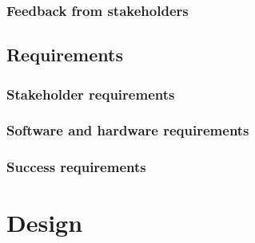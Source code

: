 \documentclass[11pt,a4paper]{article}
\begin{document}
\begin{comment}
limitations:

- time

- limited by any software

- money - hosting backend?
- not getting an apple dev account
so won't be a "true" mobile app, more of a website on the home screen.
\end{comment}

\subsubsection{Feedback from stakeholders}

\subsection{Requirements}

\subsubsection{Stakeholder requirements}
\label{sec:stakeholderRequirements}

\pagebreak

\subsubsection{Software and hardware requirements}


\pagebreak

\subsubsection{Success requirements}


\section{Design}

\begin{comment}
design: for each page/screen:

picture of page


brief desc of what the page will do

for each one show the stakeholder requirements or success requirements that will be met when this page/feature is implmented;


then break down each component of the design page.
sentance or two on what it does and why (justify it being there)

\end{comment}
\end{document}
